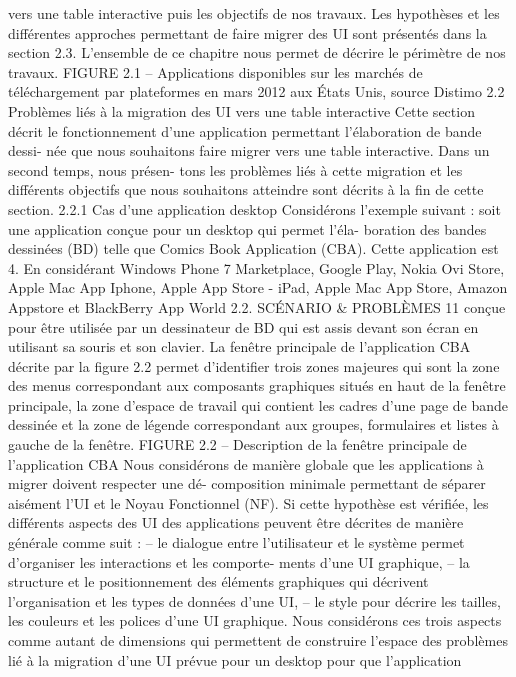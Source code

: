 \documentclass{article}
\begin{document}
vers une table interactive puis les objectifs de nos travaux. Les hypothèses et les différentes approches
permettant de faire migrer des UI sont présentés dans la section 2.3. L’ensemble de ce chapitre nous
permet de décrire le périmètre de nos travaux.
FIGURE 2.1 – Applications disponibles sur les marchés de téléchargement par plateformes en mars
2012 aux États Unis, source Distimo
2.2
Problèmes liés à la migration des UI vers une table interactive
Cette section décrit le fonctionnement d’une application permettant l’élaboration de bande dessi-
née que nous souhaitons faire migrer vers une table interactive. Dans un second temps, nous présen-
tons les problèmes liés à cette migration et les différents objectifs que nous souhaitons atteindre sont
décrits à la ﬁn de cette section.
2.2.1
Cas d’une application desktop
Considérons l’exemple suivant : soit une application conçue pour un desktop qui permet l’éla-
boration des bandes dessinées (BD) telle que Comics Book Application (CBA). Cette application est
4. En considérant Windows Phone 7 Marketplace, Google Play, Nokia Ovi Store, Apple Mac App Iphone, Apple App
Store - iPad, Apple Mac App Store, Amazon Appstore et BlackBerry App World
2.2. SCÉNARIO & PROBLÈMES
11
conçue pour être utilisée par un dessinateur de BD qui est assis devant son écran en utilisant sa souris
et son clavier. La fenêtre principale de l’application CBA décrite par la ﬁgure 2.2 permet d’identiﬁer
trois zones majeures qui sont la zone des menus correspondant aux composants graphiques situés en
haut de la fenêtre principale, la zone d’espace de travail qui contient les cadres d’une page de bande
dessinée et la zone de légende correspondant aux groupes, formulaires et listes à gauche de la fenêtre.
FIGURE 2.2 – Description de la fenêtre principale de l’application CBA
Nous considérons de manière globale que les applications à migrer doivent respecter une dé-
composition minimale permettant de séparer aisément l’UI et le Noyau Fonctionnel (NF). Si cette
hypothèse est vériﬁée, les différents aspects des UI des applications peuvent être décrites de manière
générale comme suit :
– le dialogue entre l’utilisateur et le système permet d’organiser les interactions et les comporte-
ments d’une UI graphique,
– la structure et le positionnement des éléments graphiques qui décrivent l’organisation et les
types de données d’une UI,
– le style pour décrire les tailles, les couleurs et les polices d’une UI graphique.
Nous considérons ces trois aspects comme autant de dimensions qui permettent de construire
l’espace des problèmes lié à la migration d’une UI prévue pour un desktop pour que l’application
\end{document}
